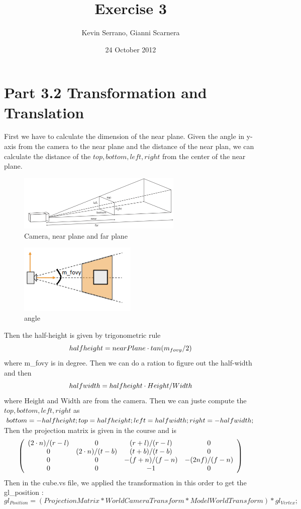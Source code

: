 \documentclass[10pt,a4paper]{report}
\author{Kevin Serrano, Gianni Scarnera}
\title{Exercise 3}
\date{24 October 2012}
\begin{document}
\maketitle

\section*{Part 3.2  Transformation and Translation}
First we have to calculate the dimension of the near plane. Given the angle in y-axis from the camera to the near plane and the distance of the near plan, we can calculate the distance of the $top,bottom,left,right$ from the center of the near plane.
\begin{figure}[h!]
\caption{Camera, near plane and far plane}
  \centering
    \includegraphics[width=0.7\textwidth]{plane.png}
\end{figure}
\begin{figure}[h!]
\caption{angle}
  \centering
    \includegraphics[width=0.5\textwidth]{angle.png}
\end{figure}
Then the half-height is given by trigonometric rule $$half\-height = nearPlane \cdot tan(m_{fovy}/2)$$ where m\_fovy is in degree. Then we can do a ration to figure out the half-width and then $$half\-width = half\-height \cdot Height/Width$$ where Height and Width are from the camera.
Then we can juste compute the $top,bottom,left,right$ as 	$bottom = -half\-height;
        top = half\-height;
        left = half\-width;
        right = -half\-width;$\\
Then the projection matrix is given in the course and is \[ \left( \begin{array}{cccc}
$$(2 \cdot n)/(r-l)$$ & 0 & $$(r+l)/(r-l)$$ & 0\\
0 & $$(2 \cdot n)/(t-b)$$ & $$(t+b)/(t-b)$$ & 0\\
0 & 0 & $$-(f+n)/(f-n)$$ & $$-(2nf)/(f-n)$$\\
0 & 0 & -1 & 0\end{array} \right)\] 
Then in the cube.vs file, we applied the transformation in this order to get the gl\_position :
$$gl_{Position} = (ProjectionMatrix * WorldCameraTransform * ModelWorldTransform) * gl_{Vertex};$$
\newpage
\end{document}
